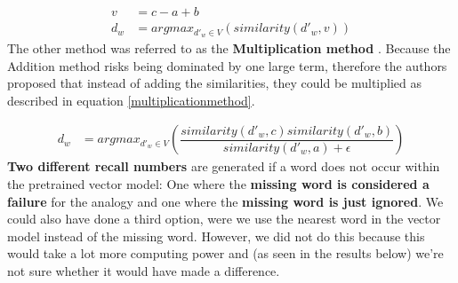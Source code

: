 \begin{equation}
\begin{split}
\label{multiplicationmethod}
v &= c-a+b\\
d_w &= argmax_{d'_w \in V}(similarity(d'_w, v) )
\end{split}
\end{equation}
\newline
The other method was referred to as the \textbf{Multiplication method} \cite{leviandgoldberg}. Because the Addition method risks being dominated by one large term, therefore the authors proposed that instead of adding the similarities, they could be multiplied as described in equation \ref{multiplicationmethod}.

\begin{equation}
\begin{split}
\label{multiplicationmethod}
d_w &= argmax_{d'_w \in V}(\dfrac{similarity(d'_w, c) similarity(d'_w, b)}{similarity(d'_w, a) + \epsilon} )
\end{split}
\end{equation}
\newline
\textbf{Two different recall numbers} are generated if a word does not occur within the pretrained vector model: One where the \textbf{missing word is considered a failure} for the analogy and one where the \textbf{missing word is just ignored}. We could also have done a third option, were we use the nearest word in the vector model instead of the missing word. However, we did not do this because this would take a lot more computing power and (as seen in the results below) we're not sure whether it would have made a difference.